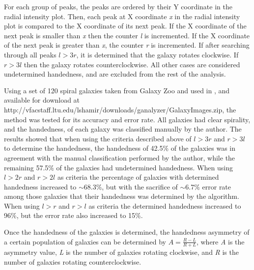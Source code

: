 \documentclass[times,twocolumn]{article}
\begin{document}
For each group of peaks, the peaks are ordered by their Y coordinate in the radial intensity plot. Then, each peak at X coordinate {\it x} in the radial intensity plot is compared to the X coordinate of its next peak. If the X coordinate of the next peak is smaller than {\it x} then the counter {\it l} is incremented. If the X coordinate of the next peak is greater than {\it x}, the counter {\it r} is incremented. If after searching through all peaks $l>3r$, it is determined that the galaxy rotates clockwise. If $r>3l$ then the galaxy rotates counterclockwise. All other cases are considered undetermined handedness, and are excluded from the rest of the analysis. 

Using a set of 120 spiral galaxies taken from Galaxy Zoo and used in \citep{Sha09,Sha11}, and available for download at \newline http://vfacstaff.ltu.edu/lshamir/downloads/ganalyzer/GalaxyImages.zip, the method was tested for its accuracy and error rate. All galaxies had clear spirality, and the handedness, of each galaxy was classified manually by the author. The results showed that when using the criteria described above of $l>3r$ and $r>3l$ to determine the handedness, the handedness of 42.5\% of the galaxies was in agreement with the manual classification performed by the author, while the remaining 57.5\% of the galaxies had undetermined handedness. When using $l>2r$ and $r>2l$ as criteria the percentage of galaxies with determined handedness increased to $\sim$68.3\%, but with the sacrifice of $\sim$6.7\% error rate among those galaxies that their handedness was determined by the algorithm. When using $l>r$ and $r>l$ as criteria the determined handedness increased to 96\%, but the error rate also increased to 15\%.

Once the handedness of the galaxies is determined, the handedness asymmetry of a certain population of galaxies can be determined by $A=\frac{R-L}{R+L}$, where {\it A} is the asymmetry value, {\it L} is the number of galaxies rotating clockwise, and {\it R} is the number of galaxies rotating counterclockwise.
\end{document}
